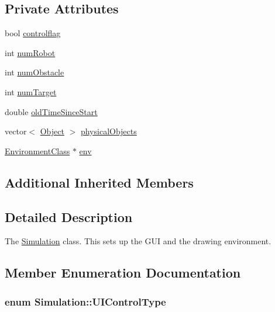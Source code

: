 \subsection*{Private Attributes}
\begin{DoxyCompactItemize}
\item 
bool \hyperlink{classSimulation_a99785aef857b01f3056bada702b53d20}{controlflag}
\item 
int \hyperlink{classSimulation_aed3fe9fceae4a68746206b7a2f9e9d7f}{num\-Robot}
\item 
int \hyperlink{classSimulation_af3da6bcb913e5ebd863c1e6828576c55}{num\-Obstacle}
\item 
int \hyperlink{classSimulation_a70862ad2a43848fa70ad5b15de598e1c}{num\-Target}
\item 
double \hyperlink{classSimulation_a9d5a2c76548907940c15b389344365df}{old\-Time\-Since\-Start}
\item 
vector$<$ \hyperlink{classObject}{Object} $>$ \hyperlink{classSimulation_ad85c769b3efdd6e70c797689d8f65e88}{physical\-Objects}
\item 
\hyperlink{classEnvironmentClass}{Environment\-Class} $\ast$ \hyperlink{classSimulation_adb82ccf6c2a4b78c73987857f5362a35}{env}
\end{DoxyCompactItemize}
\subsection*{Additional Inherited Members}


\subsection{Detailed Description}
The \hyperlink{classSimulation}{Simulation} class. This sets up the G\-U\-I and the drawing environment. 

\subsection{Member Enumeration Documentation}
\hypertarget{classSimulation_a0fd1c91d4e7699e893929d56b60a60bf}{
\subsubsection[{U\-I\-Control\-Type}]{\setlength{\rightskip}{0pt plus 5cm}enum {\bf Simulation\-::\-U\-I\-Control\-Type}}}\label{classSimulation_a0fd1c91d4e7699e893929d56b60a60bf}


